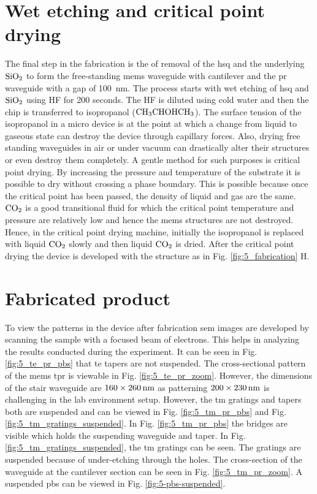 \documentclass[../report.tex]{subfiles}
\begin{document}
\section{Wet etching and critical point drying}
The final step in the fabrication is the of removal of the \gls{hsq} and the underlying $\mathrm{SiO_2}$ to form the free-standing \gls{mems} waveguide with cantilever and the \gls{pr} waveguide with a gap of \SI{100}{\nano \meter}. The process starts with wet etching of \gls{hsq} and $\mathrm{SiO_2}$ using HF for 200 seconds. The HF is diluted using cold water and then the chip is transferred to isopropanol ($\mathrm{CH_3CHOHCH_3}$). The surface tension of the isopropanol in a micro device is at the point at which a change from liquid to gaseous state can destroy the device through capillary forces. Also, drying free standing waveguides in air or under vacuum can drastically alter their structures or even destroy them completely. A gentle method for such purposes is critical point drying. By increasing the pressure and temperature of the substrate it is possible to dry without crossing a phase boundary. This is possible because once the critical point has been passed, the density of liquid and gas are the same. $\mathrm{CO_2}$ is a good transitional fluid for which the critical point temperature and pressure are relatively low and hence the \gls{mems} structures are not destroyed. Hence, in the critical point drying machine, initially the isopropanol is replaced with liquid $\mathrm{CO_2}$ slowly and then liquid $\mathrm{CO_2}$ is dried. After the critical point drying the device is developed with the structure as in Fig. \ref{fig:5_fabrication} H. 

\section{Fabricated product}

To view the patterns in the device after fabrication \gls{sem} images are developed by scanning the sample with a focused beam of electrons. This helps in analyzing the results conducted during the experiment. It can be seen in Fig. \ref{fig:5_te_pr_pbs} that \gls{te} tapers are not suspended. The cross-sectional pattern of the \gls{mems} \gls{tpr} is viewable in Fig. \ref{fig:5_te_pr_zoom}. However, the dimensions of the stair waveguide are $\mathrm{160 \times \SI{260}{\nano \meter}}$ as patterning $\mathrm{200 \times \SI{230}{\nano \meter}}$ is challenging in the lab environment setup. However, the \gls{tm} gratings and tapers both are suspended and can be viewed in Fig. \ref{fig:5_tm_pr_pbs} and Fig. \ref{fig:5_tm_gratings_suspended}. In Fig. \ref{fig:5_tm_pr_pbs} the bridges are visible which holds the suspending waveguide and taper. In Fig. \ref{fig:5_tm_gratings_suspended}, the \gls{tm} gratings can be seen. The gratings are suspended because of under-etching through the holes. The cross-section of the waveguide at the cantilever section can be seen in Fig. \ref{fig:5_tm_pr_zoom}. A suspended \gls{pbs} can be viewed in Fig. \ref{fig:5-pbs-suspended}.
\end{document}
